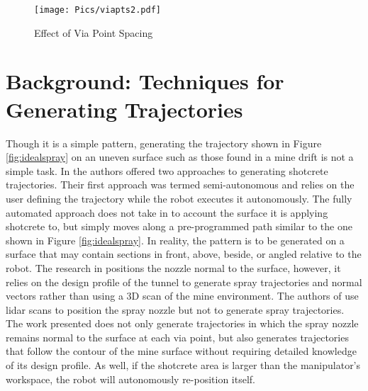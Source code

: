 \begin{figure}[h]
    \centering
    \texttt{[image: Pics/viapts2.pdf]}
    \caption{Effect of Via Point Spacing}
    \label{fig:viapts}
\end{figure}

\section{Background: Techniques for Generating Trajectories}
Though it is a simple pattern, generating the trajectory shown in Figure \ref{fig:idealspray} on an uneven surface such as those found in a mine drift is not a simple task. In \cite{fully} the authors offered two approaches to generating shotcrete trajectories. Their first approach was termed semi-autonomous and relies on the user defining the trajectory while the robot executes it autonomously. The fully automated approach does not take in to account the surface it is applying shotcrete to, but simply moves along a pre-programmed path similar to the one shown in Figure \ref{fig:idealspray}. In reality, the pattern is to be generated on a surface that may contain sections in front, above, beside, or angled relative to the robot. The research in \cite{steal} positions the nozzle normal to the surface, however, it relies on the design profile of the tunnel to generate spray trajectories and normal vectors rather than using a 3D scan of the mine environment. The authors of \cite{artd} use \acrshort{lidar} scans to position the spray nozzle but not to generate spray trajectories. The work presented does not only generate trajectories in which the spray nozzle remains normal to the surface at each via point, but also generates trajectories that follow the contour of the mine surface without requiring detailed knowledge of its design profile. As well, if the shotcrete area is larger than the manipulator's workspace, the robot will autonomously re-position itself.\\

